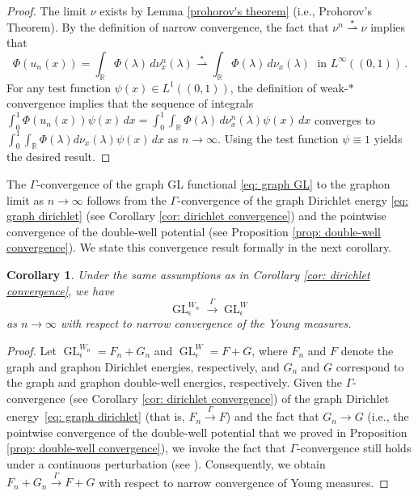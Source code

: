 \documentclass[11pt]{amsart}
\newtheorem{corollary}{Corollary}
\def\R{\mathbb{R}}
\def\ep{\epsilon}
\def\ra{\rightarrow}
\def\gamra{\stackrel{\Gamma}{\longrightarrow}}
\def\weakstarra{\stackrel{\star}{\rightharpoonup}}
\def\GL{\operatorname{GL}}
\numberwithin{equation}{section}
\begin{document}
{{\begin{proof}
    The limit $\nu$ exists by Lemma \ref{prohorov's theorem} ({i.e.,} Prohorov's Theorem). 
    By the definition of narrow convergence, {the fact that $\nu^n \weakstarra \nu$ implies that} 
 \begin{equation} \label{narrow conv phi_n}
    \Phi(u_n(x)) = \int_\R \Phi(\lambda) \,d\nu^n_x(\lambda) \weakstarra \int_{\R} \Phi(\lambda) \,d\nu_x(\lambda) \; \text{ in }L^\infty((0,1)) \,.  
\end{equation}    
For any test function $\psi(x) \in L^1((0,1))$, the definition of weak-$*$ convergence implies that the sequence of integrals $\int_0^1 \Phi(u_n(x)) \psi(x) \,dx = \int_0^1 \int_\R \Phi(\lambda) \, d\nu^n_x(\lambda) \psi(x) \, dx$ converges to 
\\
$\int_0^1 \int_\R \Phi(\lambda) d\nu_x(\lambda) \psi(x) \,dx$ as $n\ra\infty$. Using the test function $\psi \equiv 1$ yields the desired result. 


\end{proof}

The $\Gamma$-convergence of the graph GL functional \eqref{eq: graph GL} {to the graphon limit as $n \to \infty$} follows from the $\Gamma$-convergence of the graph Dirichlet energy \eqref{eq: graph dirichlet} (see Corollary \ref{cor: dirichlet convergence}) and the pointwise convergence of the double-well potential (see Proposition \ref{prop: double-well convergence}). We state this convergence result formally in the next corollary.

\begin{corollary} \label{cor: gl gamma convergence}
    Under the same assumptions as in Corollary \ref{cor: dirichlet convergence}, we have
 \begin{equation} 
    \GL^{W_n}_\ep \gamra \GL^W_\ep
  \end{equation}   
    as $n \ra \infty$ with respect to narrow convergence of the Young measures.
\end{corollary}



\begin{proof}
Let $\GL^{W_n}_\ep= F_n + G_n$ and $\GL^W_\ep= F + G$, where $F_n$ and $F$ denote the graph and graphon Dirichlet energies, respectively, and $G_n$ and $G$ correspond to the graph and graphon double-well energies, respectively.
Given the $\Gamma$-convergence (see Corollary \ref{cor: dirichlet convergence}) of the graph Dirichlet energy~\eqref{eq: graph dirichlet} (that is, $F_n \gamra F$) and the fact that $G_n \ra G$ (i.e., the pointwise convergence of the double-well potential that we proved in Proposition \ref{prop: double-well convergence}), we invoke the fact that $\Gamma$-convergence still holds under a continuous perturbation (see \cite[Remark 2.2]{braides2006handbook}).
Consequently, we obtain $F_n + G_n \gamra F + G$ with respect to narrow convergence of Young measures. 
\end{proof}

}}
\end{document}
